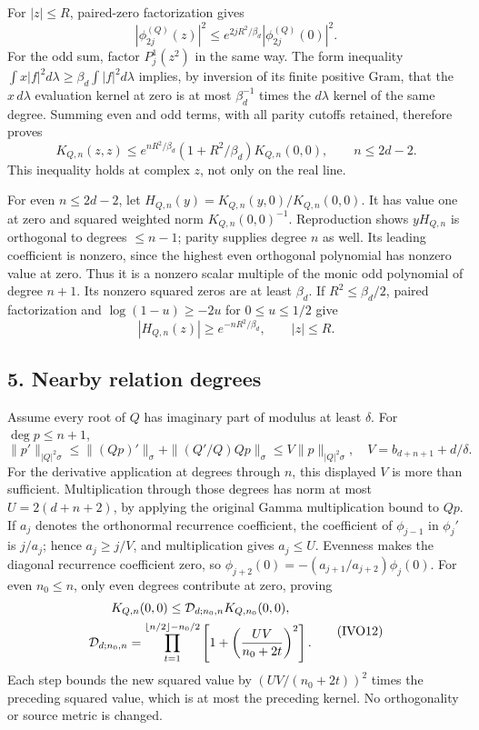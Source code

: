For \(|z|\le R\), paired-zero factorization gives \[
|\phi_{2j}^{(Q)}(z)|^2
\le e^{2jR^2/\beta_d}|\phi_{2j}^{(Q)}(0)|^2.
\] For the odd sum, factor \(P_j^1(z^2)\) in the same way. The form inequality \(\int x|f|^2d\lambda\ge\beta_d\int|f|^2d\lambda\) implies, by inversion of its finite positive Gram, that the \(x\,d\lambda\) evaluation kernel at zero is at most \(\beta_d^{-1}\) times the \(d\lambda\) kernel of the same degree. Summing even and odd terms, with all parity cutoffs retained, therefore proves \[
K_{Q,n}(z,z)\le e^{nR^2/\beta_d}
(1+R^2/\beta_d)K_{Q,n}(0,0),\qquad n\le2d-2.
\tag{IVO10}
\] This inequality holds at complex \(z\), not only on the real line.

For even \(n\le2d-2\), let \(H_{Q,n}(y)=K_{Q,n}(y,0)/K_{Q,n}(0,0)\). It has value one at zero and squared weighted norm \(K_{Q,n}(0,0)^{-1}\). Reproduction shows \(yH_{Q,n}\) is orthogonal to degrees \(\le n-1\); parity supplies degree \(n\) as well. Its leading coefficient is nonzero, since the highest even orthogonal polynomial has nonzero value at zero. Thus it is a nonzero scalar multiple of the monic odd polynomial of degree \(n+1\). Its nonzero squared zeros are at least \(\beta_d\). If \(R^2\le\beta_d/2\), paired factorization and \(\log(1-u)\ge-2u\) for \(0\le u\le1/2\) give \[
|H_{Q,n}(z)|\ge e^{-nR^2/\beta_d},\qquad |z|\le R.
\tag{IVO11}
\]

\subsection{5. Nearby relation degrees}\label{nearby-relation-degrees}

Assume every root of \(Q\) has imaginary part of modulus at least \(\delta\). For \(\deg p\le n+1\), \[
\|p'\|_{|Q|^2\sigma}
\le\|(Qp)'\|_\sigma+\|(Q'/Q)Qp\|_\sigma
\le V\|p\|_{|Q|^2\sigma},\quad
V=b_{d+n+1}+d/\delta.
\] For the derivative application at degrees through \(n\), this displayed \(V\) is more than sufficient. Multiplication through those degrees has norm at most \(U=2(d+n+2)\), by applying the original Gamma multiplication bound to \(Qp\). If \(a_j\) denotes the orthonormal recurrence coefficient, the coefficient of \(\phi_{j-1}\) in \(\phi_j'\) is \(j/a_j\); hence \(a_j\ge j/V\), and multiplication gives \(a_j\le U\). Evenness makes the diagonal recurrence coefficient zero, so \(\phi_{j+2}(0)=-(a_{j+1}/a_{j+2})\phi_j(0)\). For even \(n_0\le n\), only even degrees contribute at zero, proving \[
\begin{gathered}
K_{Q,n}(0,0)\le{\cal D}_{d;n_0,n}K_{Q,n_0}(0,0),\\
{\cal D}_{d;n_0,n}=
\prod_{t=1}^{\lfloor n/2\rfloor-n_0/2}
\left[1+\left(\frac{UV}{n_0+2t}\right)^2\right].
\end{gathered}\tag{IVO12}
\] Each step bounds the new squared value by \((UV/(n_0+2t))^2\) times the preceding squared value, which is at most the preceding kernel. No orthogonality or source metric is changed.

